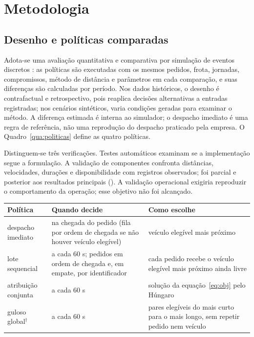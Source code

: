 \section{Metodologia}\label{sec:metodo}

\subsection{Desenho e políticas comparadas}

Adota-se uma avaliação quantitativa e comparativa por simulação de eventos discretos \cite{banks2010}: as políticas são executadas com os mesmos pedidos, frota, jornadas, compromissos, método de distância e parâmetros em cada comparação, e suas diferenças são calculadas por período. Nos dados históricos, o desenho é contrafactual e retrospectivo, pois reaplica decisões alternativas a entradas registradas; nos cenários sintéticos, varia condições geradas para examinar o método. A diferença estimada é interna ao simulador; o despacho imediato é uma regra de referência, não uma reprodução do despacho praticado pela empresa. O Quadro~\ref{qua:politicas} define as quatro políticas.

Distinguem-se três verificações. Testes automáticos examinam se a implementação segue a formulação. A validação de componentes confronta distâncias, velocidades, durações e disponibilidade com registros observados; foi parcial e posterior aos resultados principais (). A validação operacional exigiria reproduzir o comportamento da operação; esse objetivo não foi alcançado.

\begin{quadro}[!htb]
\caption{Políticas comparadas: despacho imediato (A), lote sequencial (B), atribuição conjunta (C) e guloso global (D)}\label{qua:politicas}
\centering\fontetabela
\begin{tabular}{|>{\raggedright\arraybackslash}p{34mm}|>{\raggedright\arraybackslash}p{60mm}|>{\raggedright\arraybackslash}p{54mm}|}
\hline
\textbf{Política} & \textbf{Quando decide} & \textbf{Como escolhe} \\
\hline
despacho imediato & na chegada do pedido (fila por ordem de chegada se não houver veículo elegível) & veículo elegível mais próximo \\
\hline
lote sequencial & a cada 60 s; pedidos em ordem de chegada e, em empate, por identificador & cada pedido recebe o veículo elegível mais próximo ainda livre \\
\hline
atribuição conjunta & a cada 60 s & solução da equação~\ref{eq:obj} pelo Húngaro \\
\hline
guloso global$^\dagger$ & a cada 60 s & pares elegíveis do mais curto para o mais longo, sem repetir pedido nem veículo \\
\hline
\end{tabular}
\end{quadro}

